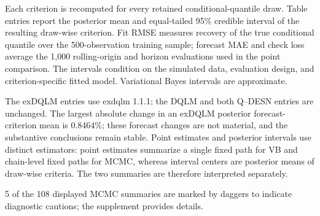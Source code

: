 Each criterion is recomputed for every retained conditional-quantile draw. Table entries report the posterior mean and equal-tailed 95\% credible interval of the resulting draw-wise criterion. Fit RMSE measures recovery of the true conditional quantile over the 500-observation training sample; forecast MAE and check loss average the 1,000 rolling-origin and horizon evaluations used in the point comparison. The intervals condition on the simulated data, evaluation design, and criterion-specific fitted model. Variational Bayes intervals are approximate.

The exDQLM entries use exdqlm 1.1.1; the DQLM and both Q--DESN entries are unchanged. The largest absolute change in an exDQLM posterior forecast-criterion mean is 0.8464\%; these forecast changes are not material, and the substantive conclusions remain stable. Point estimates and posterior intervals use distinct estimators: point estimates summarize a single fixed path for VB and chain-level fixed paths for MCMC, whereas interval centers are posterior means of draw-wise criteria. The two summaries are therefore interpreted separately.

5 of the 108 displayed MCMC summaries are marked by daggers to indicate diagnostic cautions; the supplement provides details.
